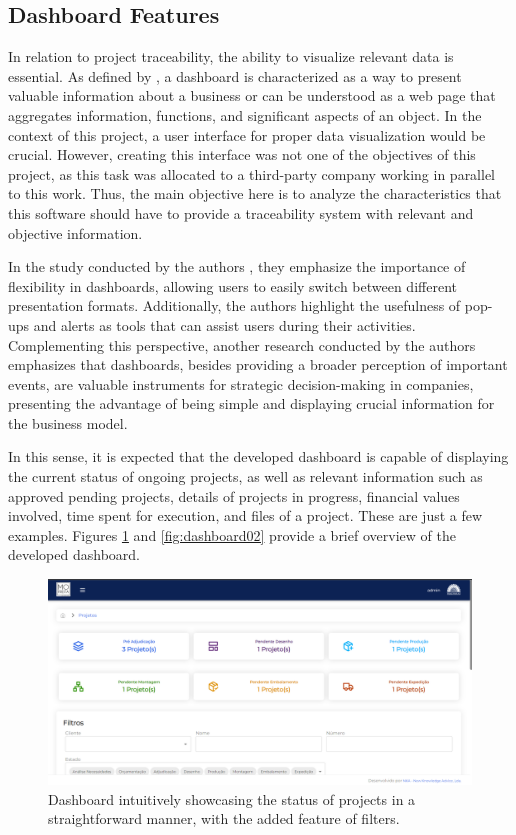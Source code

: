 \subsection{Dashboard Features}

In relation to project traceability, the ability to visualize relevant data is essential. As defined by \textcite{old2023}, a dashboard is characterized as a way to present valuable information about a business or can be understood as a web page that aggregates information, functions, and significant aspects of an object. In the context of this project, a user interface for proper data visualization would be crucial. However, creating this interface was not one of the objectives of this project, as this task was allocated to a third-party company working in parallel to this work. Thus, the main objective here is to analyze the characteristics that this software should have to provide a traceability system with relevant and objective information.

In the study conducted by the authors \textcite{YIGITBASIOGLU201241}, they emphasize the importance of flexibility in dashboards, allowing users to easily switch between different presentation formats. Additionally, the authors highlight the usefulness of pop-ups and alerts as tools that can assist users during their activities. Complementing this perspective, another research conducted by the authors \textcite{NADJ2020113322} emphasizes that dashboards, besides providing a broader perception of important events, are valuable instruments for strategic decision-making in companies, presenting the advantage of being simple and displaying crucial information for the business model.

In this sense, it is expected that the developed dashboard is capable of displaying the current status of ongoing projects, as well as relevant information such as approved pending projects, details of projects in progress, financial values involved, time spent for execution, and files of a project. These are just a few examples. Figures \ref{fig:dashboard01} and \ref{fig:dashboard02} provide a brief overview of the developed dashboard.

\begin{figure}[!ht]
 \centering
         \includegraphics[width=0.65\linewidth]{images/Development/chap4/dashboard_01.png}
         \caption{Dashboard intuitively showcasing the status of projects in a straightforward manner, with the added feature of filters.}
         \label{fig:dashboard01}
\end{figure}

